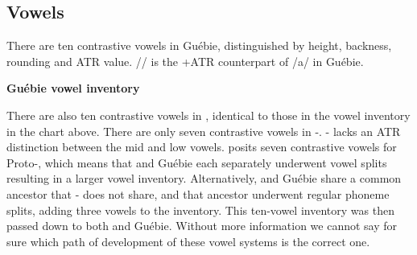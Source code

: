 \documentclass[output=paper,modfonts]{langscibook}
\begin{document}
\subsection{Vowels}

There are ten contrastive vowels in Guébie, distinguished by height, backness, rounding and ATR value. // is the +ATR counterpart of /a/ in Guébie.

\pagebreak
\begin{exe}
\ex
 \textbf{Guébie vowel inventory}

\end{exe}

There are also ten contrastive vowels in , identical to those in the vowel inventory in the chart above. There are only seven contrastive vowels in -. - lacks an ATR distinction between the mid and low vowels. \cite{Marchese2012} posits seven contrastive vowels for Proto-, which means that  and Guébie each separately underwent vowel splits resulting in a larger vowel inventory. Alternatively,  and Guébie share a common ancestor that - does not share, and that ancestor underwent regular phoneme splits, adding three vowels to the inventory. This ten-vowel inventory was then passed down to both  and Guébie. Without more information we cannot say for sure which path of development of these vowel systems is the correct one.
\end{document}

